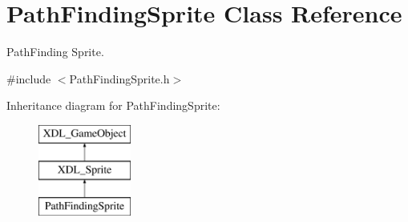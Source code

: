 \hypertarget{class_path_finding_sprite}{\section{Path\-Finding\-Sprite Class Reference}
\label{class_path_finding_sprite}
}


Path\-Finding Sprite.  




{\ttfamily \#include $<$Path\-Finding\-Sprite.\-h$>$}

Inheritance diagram for Path\-Finding\-Sprite\-:\begin{figure}[H]
\begin{center}
\leavevmode
\includegraphics[height=3.000000cm]{class_path_finding_sprite}
\end{center}
\end{figure}
